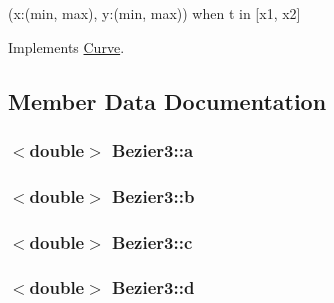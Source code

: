 (x\+:(min, max), y\+:(min, max)) when t in \mbox{[}x1, x2\mbox{]} 



Implements \hyperlink{classCurve_add48a303ee076bfce08340dd1241cbf6}{Curve}.



\subsection{Member Data Documentation}
\subsubsection[{\texorpdfstring{a}{a}}]{$<$double$>$ Bezier3\+::a\hspace{0.3cm}{\ttfamily [private]}}\hypertarget{classBezier3_ae83be4ce590bf7a7a2bf53adeeb170cf}{}\label{classBezier3_ae83be4ce590bf7a7a2bf53adeeb170cf}
\subsubsection[{\texorpdfstring{b}{b}}]{$<$double$>$ Bezier3\+::b\hspace{0.3cm}{\ttfamily [private]}}\hypertarget{classBezier3_ad63b9a75228af1727b61fe032f7e2f68}{}\label{classBezier3_ad63b9a75228af1727b61fe032f7e2f68}
\subsubsection[{\texorpdfstring{c}{c}}]{$<$double$>$ Bezier3\+::c\hspace{0.3cm}{\ttfamily [private]}}\hypertarget{classBezier3_aafb4270797f10af53a7feba1a66d59a0}{}\label{classBezier3_aafb4270797f10af53a7feba1a66d59a0}
\subsubsection[{\texorpdfstring{d}{d}}]{$<$double$>$ Bezier3\+::d\hspace{0.3cm}{\ttfamily [private]}}\hypertarget{classBezier3_a5ce0d6743e932b0096b64804324dad9b}{}\label{classBezier3_a5ce0d6743e932b0096b64804324dad9b}
